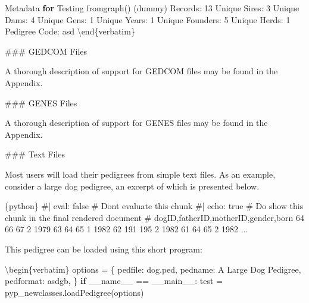 \documentclass[
  letterpaper,
  DIV=11,
  numbers=noendperiod]{scrreprt}
\newenvironment{Shaded}{\begin{snugshade}}{\end{snugshade}}
\newcommand{\AlertTok}[1]{\textcolor[rgb]{0.68,0.00,0.00}{#1}}
\newcommand{\CommentTok}[1]{\textcolor[rgb]{0.37,0.37,0.37}{#1}}
\newcommand{\ControlFlowTok}[1]{\textcolor[rgb]{0.00,0.23,0.31}{\textbf{#1}}}
\newcommand{\DecValTok}[1]{\textcolor[rgb]{0.68,0.00,0.00}{#1}}
\newcommand{\NormalTok}[1]{\textcolor[rgb]{0.00,0.23,0.31}{#1}}
\newcommand{\OperatorTok}[1]{\textcolor[rgb]{0.37,0.37,0.37}{#1}}
\newcommand{\StringTok}[1]{\textcolor[rgb]{0.13,0.47,0.30}{#1}}
\newcommand{\VariableTok}[1]{\textcolor[rgb]{0.07,0.07,0.07}{#1}}
\begin{document}
\begin{Shaded}
\begin{Highlighting}[]
\NormalTok{Metadata }\ControlFlowTok{for}\NormalTok{  Testing fromgraph() (dummy)}
\NormalTok{Records:                }\DecValTok{13}
\NormalTok{Unique Sires:           }\DecValTok{3}
\NormalTok{Unique Dams:            }\DecValTok{4}
\NormalTok{Unique Gens:            }\DecValTok{1}
\NormalTok{Unique Years:           }\DecValTok{1}
\NormalTok{Unique Founders:        }\DecValTok{5}
\NormalTok{Unique Herds:           }\DecValTok{1}
\NormalTok{Pedigree Code:          asd}
\NormalTok{\textbackslash{}end\{verbatim\}}
\CommentTok{\textquotesingle{}\textquotesingle{}\textquotesingle{}}

\AlertTok{\#\#\#}\CommentTok{ GEDCOM Files}

\CommentTok{A thorough description of support for GEDCOM files may be found in the Appendix.}

\AlertTok{\#\#\#}\CommentTok{ GENES Files}

\CommentTok{A thorough description of support for GENES files may be found in the Appendix.}

\AlertTok{\#\#\#}\CommentTok{ Text Files}

\CommentTok{Most users will load their pedigrees from simple text files. As an example, consider a large dog pedigree, an excerpt of}
\CommentTok{which is presented below.}

\CommentTok{\textasciigrave{}\textasciigrave{}\textasciigrave{}\{python\}}
\CommentTok{\#| eval: false      \# Don\textquotesingle{}t evaluate this chunk}
\CommentTok{\#| echo: true       \# Do show this chunk in the final rendered document}
\CommentTok{\# dogID,fatherID,motherID,gender,born}
\CommentTok{64 66 67 2 1979}
\CommentTok{63 64 65 1 1982}
\CommentTok{62 191 195 2 1982}
\CommentTok{61 64 65 2 1982}
\CommentTok{...}
\end{Highlighting}
\end{Shaded}

This pedigree can be loaded using this short program:

\begin{Shaded}
\begin{Highlighting}[]
\NormalTok{\textbackslash{}begin\{verbatim\}}
\NormalTok{options }\OperatorTok{=}\NormalTok{ \{}
    \StringTok{\textquotesingle{}pedfile\textquotesingle{}}\NormalTok{: }\StringTok{\textquotesingle{}dog.ped\textquotesingle{}}\NormalTok{,}
    \StringTok{\textquotesingle{}pedname\textquotesingle{}}\NormalTok{: }\StringTok{\textquotesingle{}A Large Dog Pedigree\textquotesingle{}}\NormalTok{,}
    \StringTok{\textquotesingle{}pedformat\textquotesingle{}}\NormalTok{: }\StringTok{\textquotesingle{}asdgb\textquotesingle{}}\NormalTok{,}
\NormalTok{\}}
\ControlFlowTok{if} \VariableTok{\_\_name\_\_} \OperatorTok{==} \StringTok{\textquotesingle{}\_\_main\_\_\textquotesingle{}}\NormalTok{:}
\NormalTok{    test }\OperatorTok{=}\NormalTok{ pyp\_newclasses.loadPedigree(options)}
\end{Highlighting}
\end{Shaded}
\end{document}
